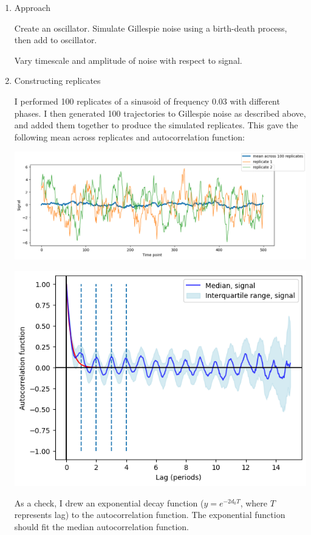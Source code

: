 \begin{enumerate}
\begin{enumerate}
\begin{enumerate}
\item Approach
\label{sec:orgd554193}

Create an oscillator.  Simulate Gillespie noise using a birth-death process, then add to oscillator.

Vary timescale and amplitude of noise with respect to signal.

\item Constructing replicates
\label{sec:orge2355a3}

I performed 100 replicates of a sinusoid of frequency 0.03 with different phases.  I then generated 100 trajectories to Gillespie noise as described above, and added them together to produce the simulated replicates.  This gave the following mean across replicates and autocorrelation function:
\begin{center}
\includegraphics[width=.9\linewidth]{gillespie_k5_d0p05_mean.png}
\end{center}
\begin{center}
\includegraphics[width=.9\linewidth]{gillespie_k5_d0p05_acf.png}
\end{center}

As a check, I drew an exponential decay function (\(y = e^{-2d_{0}T}\), where \(T\) represents lag) to the autocorrelation function.  The exponential function should fit the median autocorrelation function.


\end{enumerate}
\end{enumerate}
\end{enumerate}
